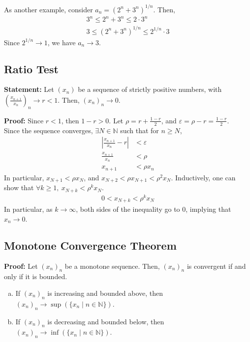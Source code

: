 \documentclass[10pt]{extarticle}
\newcommand{\N}{\mathbb{N}}
\begin{document}
    As another example, consider $a_n = \left(2^n + 3^n\right)^{1/n}$. Then,
    \begin{align*}
      3^n \leq 2^n + 3^n \leq 2\cdot 3^n\\
      3 \leq \left(2^n + 3^n\right)^{1/n} \leq 2^{1/n}\cdot 3
    \end{align*}
    Since $2^{1/n} \rightarrow 1$, we have $a_n \rightarrow 3$.
  \subsection{Ratio Test}%
  \textbf{Statement:} Let $\left(x_n\right)$ be a sequence of strictly positive numbers, with $\left(\frac{x_{n+1}}{x_n}\right)_n \rightarrow r < 1$. Then, $(x_n)_n \rightarrow 0$.

  \textbf{Proof:} Since $r < 1$, then $1-r > 0$. Let $\rho = r + \frac{1-r}{2}$, and $\varepsilon = \rho - r = \frac{1-r}{2}$.\\

    Since the sequence converges, $\exists N\in\N$ such that for $n\geq N$,
    \begin{align*}
      \left|\frac{x_{n+1}}{x_n} - r \right| &< \varepsilon\\
      \frac{x_{n+1}}{x_n} &< \rho\\
      x_{n+1} &< \rho x_n
    \end{align*}
    In particular, $x_{N+1} < \rho x_N$, and $x_{N+2} < \rho x_{N+1} < \rho^2 x_N$. Inductively, one can show that $\forall k\geq 1,~x_{N+k} < \rho^{k}x_{N}$.
    \begin{align*}
      0 < x_{N + k} < \rho^{k}x_{N}
    \end{align*}
    In particular, as $k \rightarrow \infty$, both sides of the inequality go to $0$, implying that $x_{n}\rightarrow 0$.
  \subsection{Monotone Convergence Theorem}%
  \textbf{Proof:} Let $(x_n)_n$ be a monotone sequence. Then, $(x_n)_n$ is convergent if and only if it is bounded.
    \begin{enumerate}[(a)]
      \item If $(x_n)_n$ is increasing and bounded above, then $(x_n)_n \rightarrow \sup(\{x_n\mid n\in\N\})$.
      \item If $(x_n)_n$ is decreasing and bounded below, then $(x_n)_n \rightarrow \inf(\{x_n\mid n\in\N\})$.
    \end{enumerate}
\end{document}
